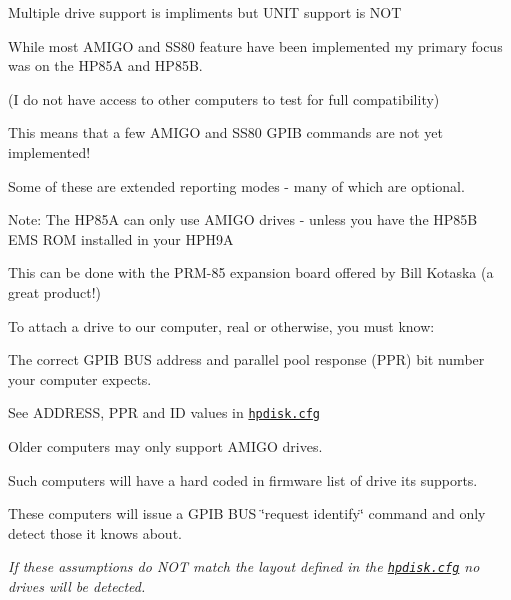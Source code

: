 Multiple drive support is impliments but U\+N\+IT support is N\+OT
\begin{DoxyItemize}
\item While most A\+M\+I\+GO and S\+S80 feature have been implemented my primary focus was on the H\+P85A and H\+P85B.
\begin{DoxyItemize}
\item (I do not have access to other computers to test for full compatibility)
\item This means that a few A\+M\+I\+GO and S\+S80 G\+P\+IB commands are not yet implemented!
\begin{DoxyItemize}
\item Some of these are extended reporting modes -\/ many of which are optional.
\end{DoxyItemize}
\item Note\+: The H\+P85A can only use A\+M\+I\+GO drives -\/ unless you have the H\+P85B E\+MS R\+OM installed in your H\+P\+H9A
\begin{DoxyItemize}
\item This can be done with the P\+R\+M-\/85 expansion board offered by Bill Kotaska (a great product!)
\end{DoxyItemize}
\end{DoxyItemize}
\item To attach a drive to our computer, real or otherwise, you must know\+:
\begin{DoxyItemize}
\item The correct G\+P\+IB B\+US address and parallel pool response (P\+PR) bit number your computer expects.
\begin{DoxyItemize}
\item See A\+D\+D\+R\+E\+SS, P\+PR and ID values in \href{sdcard.cfg}{\tt hpdisk.\+cfg}
\end{DoxyItemize}
\item Older computers may only support A\+M\+I\+GO drives.
\begin{DoxyItemize}
\item Such computers will have a hard coded in firmware list of drive its supports.
\begin{DoxyItemize}
\item These computers will issue a G\+P\+IB B\+US \char`\"{}request identify\char`\"{} command and only detect those it knows about.
\item {\itshape If these assumptions do N\+OT match the layout defined in the \href{sdcard/sdcard.cfg}{\tt hpdisk.\+cfg} no drives will be detected.}

\end{DoxyItemize}
\end{DoxyItemize}
\end{DoxyItemize}
\end{DoxyItemize}
